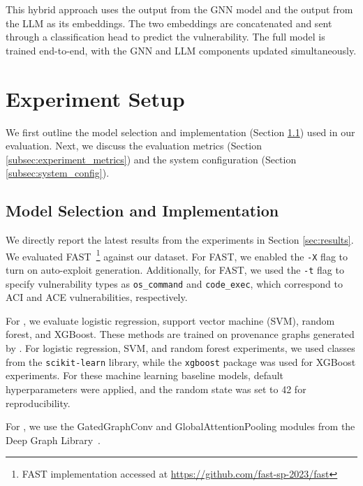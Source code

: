\documentclass[12pt,openany,oneside,table]{cmuthesis}
\begin{document}
This hybrid approach uses the output from the GNN model and the output from the LLM as its embeddings. The two embeddings are concatenated and sent through a classification head to predict the vulnerability. The full model is trained end-to-end, with the GNN and LLM components updated simultaneously.


\section{Experiment Setup}
We first outline the model selection and implementation (Section \ref{subsec:model_selection}) used in our evaluation. Next, we discuss the evaluation metrics (Section \ref{subsec:experiment_metrics}) and the system configuration (Section \ref{subsec:system_config}).



\subsection{Model Selection and Implementation}\label{subsec:model_selection}

We directly report the latest results from the \nodemedicfine experiments in Section \ref{sec:results}. We evaluated FAST~\footnote{FAST implementation accessed at \url{https://github.com/fast-sp-2023/fast}}
against our dataset. For FAST, we enabled the \texttt{-X} flag to turn on auto-exploit generation. 
Additionally, for FAST, we used the \texttt{-t} flag to specify vulnerability types as \texttt{os\_command} and \texttt{code\_exec}, which correspond to ACI and ACE vulnerabilities, respectively.


For , we evaluate %
logistic regression, support vector machine (SVM), random forest, and XGBoost. These methods are trained on provenance graphs generated by \nodemedicfine. For logistic regression, SVM, and random forest experiments, we used classes from the \texttt{scikit-learn} library, while the \texttt{xgboost} package was used for XGBoost experiments. For these machine learning baseline models, default hyperparameters were applied, and the random state was set to 42 for reproducibility.

For , we use the GatedGraphConv and GlobalAttentionPooling modules from the Deep Graph Library~\cite{wang2019deep}.
\end{document}
